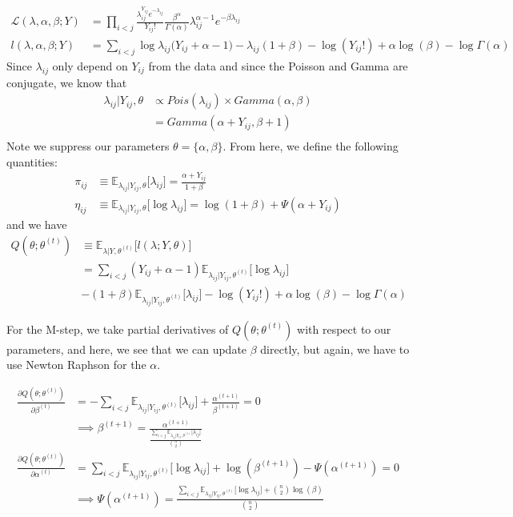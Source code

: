 \documentclass{article}
\begin{document}
\begin{align*}
\mathcal{L}(\lambda, \alpha, \beta; Y) &= \prod_{i<j}\frac{\lambda_{ij}^{Y_{ij}}e^{-\lambda_{ij}}}{Y_{ij}!} \frac{\beta^{\alpha}}{\Gamma(\alpha)}\lambda_{ij}^{\alpha - 1}e^{-\beta \lambda_{ij}} \\
l(\lambda, \alpha, \beta ; Y) &= \sum_{i<j} \log \lambda_{ij}\big(Y_{ij} + \alpha - 1) - \lambda_{ij}(1+ \beta) -\log(Y_{ij}!) + \alpha \log(\beta) - \log \Gamma(\alpha)
\end{align*}
Since $\lambda_{ij}$ only depend on $Y_{ij}$ from the data and since the Poisson and Gamma are conjugate, we know that 
\begin{align*}
\lambda_{ij}|Y_{ij}, \theta &\propto Pois(\lambda_{ij}) \times Gamma(\alpha, \beta ) \\
	&= Gamma(\alpha + Y_{ij}, \beta + 1) \\
\end{align*}
Note we suppress our parameters $\theta = \{\alpha, \beta\}$. From here, we define the following quantities:
\begin{align*}
\pi_{ij} &\equiv \mathbb{E}_{\lambda_{ij}|Y_{ij}, \theta}\big[\lambda_{ij} \big] = \frac{\alpha + Y_{ij}}{1+ \beta} \\
\eta_{ij} &\equiv \mathbb{E}_{\lambda_{ij}|Y_{ij}, \theta}\big[\log \lambda_{ij} \big] = \log(1 + \beta) + \Psi (\alpha + Y_{ij})
\end{align*}
and we have
\begin{align*}
Q(\theta; \theta^{(t)}) &\equiv \mathbb{E}_{\lambda|Y, \theta^{(t)}}\big[l (\lambda; Y, \theta) \big] \\
	&= \sum_{i<j} (Y_{ij}+ \alpha - 1)\mathbb{E}_{\lambda_{ij}|Y_{ij}, \theta^{(t)}} \big[\log \lambda_{ij}\big] \\
	&- (1+ \beta)\mathbb{E}_{\lambda_{ij}|Y_{ij}, \theta^{(t)}}\big[\lambda_{ij}\big] -\log(Y_{ij}!) + \alpha \log(\beta) - \log \Gamma(\alpha)
\end{align*}

For the M-step, we take partial derivatives of $Q(\theta; \theta^{(t)})$ with respect to our parameters, and here, we see that we can update $\beta$ directly, but again, we have to use Newton Raphson for the $\alpha$. 

\begin{align*}
\frac{\partial Q(\theta; \theta^{(t)})}{\partial \beta^{(t)}}  &= -\sum_{i<j}\mathbb{E}_{\lambda_{ij}|Y_{ij}, \theta^{(t)}} \big[\lambda_{ij}\big] + \frac{\alpha^{(t+1)}}{\beta^{(t+1)}}= 0\\
	&\implies \beta^{(t+1)} = \frac{\alpha^{(t+1)}}{\frac{\sum_{i<j}\mathbb{E}_{\lambda_{ij}|Y_{ij}, \theta^{(t)}} \big[\lambda_{ij} \big]}{{n \choose 2}}  }\tag{$\beta_W$}\\
\frac{\partial Q(\theta; \theta^{(t)})}{\partial \alpha^{(t)}} &= \sum_{i<j}\mathbb{E}_{\lambda_{ij}|Y_{ij}, \theta^{(t)}} \big[\log \lambda_{ij}\big] + \log(\beta^{(t+1)}) - \Psi(\alpha^{(t+1)}) = 0\\
	&\implies \Psi(\alpha^{(t+1)}) = \frac{\sum_{i<j} \mathbb{E}_{\lambda_{ij}|Y_{ij}, \theta^{(t)}} \big[\log \lambda_{ij}\big] + {n \choose 2} \log(\beta)}{{n \choose 2} } \tag{MW1}
\end{align*}
\end{document}
